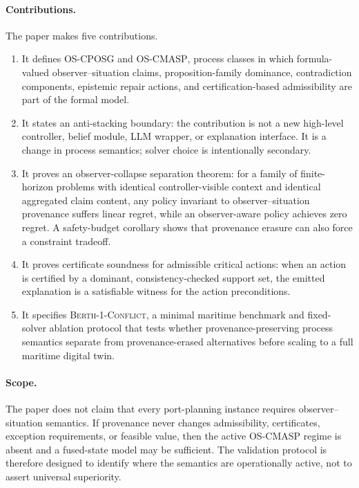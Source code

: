 \documentclass[11pt]{article}
\newcommand{\OSCPOSG}{\mbox{\normalfont\textsc{OS-CPOSG}}}
\newcommand{\OSCMASP}{\mbox{\normalfont\textsc{OS-CMASP}}}
\newcommand{\1}{\mathbf{1}}
\theoremstyle{definition}
\theoremstyle{plain}
\theoremstyle{remark}
\begin{document}
\paragraph{Contributions.} The paper makes five contributions.
\begin{enumerate}[leftmargin=1.6em]
  \item It defines \OSCPOSG{} and \OSCMASP, process classes in which formula-valued observer--situation claims, proposition-family dominance, contradiction components, epistemic repair actions, and certification-based admissibility are part of the formal model.
  \item It states an anti-stacking boundary: the contribution is not a new high-level controller, belief module, LLM wrapper, or explanation interface. It is a change in process semantics; solver choice is intentionally secondary.
  \item It proves an observer-collapse separation theorem: for a family of finite-horizon problems with identical controller-visible context and identical aggregated claim content, any policy invariant to observer--situation provenance suffers linear regret, while an observer-aware policy achieves zero regret. A safety-budget corollary shows that provenance erasure can also force a constraint tradeoff.
  \item It proves certificate soundness for admissible critical actions: when an action is certified by a dominant, consistency-checked support set, the emitted explanation is a satisfiable witness for the action preconditions.
  \item It specifies \textsc{Berth-1-Conflict}, a minimal maritime benchmark and fixed-solver ablation protocol that tests whether provenance-preserving process semantics separate from provenance-erased alternatives before scaling to a full maritime digital twin.
\end{enumerate}

\paragraph{Scope.} The paper does not claim that every port-planning instance requires observer--situation semantics. If provenance never changes admissibility, certificates, exception requirements, or feasible value, then the active OS-CMASP regime is absent and a fused-state model may be sufficient. The validation protocol is therefore designed to identify where the semantics are operationally active, not to assert universal superiority.
\end{document}
